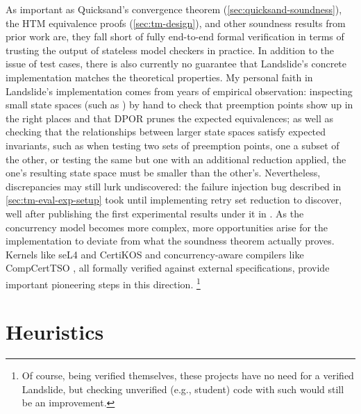 As important as Quicksand's convergence theorem (\cref{sec:quicksand-soundness}),
the HTM equivalence proofs (\cref{sec:tm-design}),
and other soundness results from prior work are,
they fall short of fully end-to-end formal verification
in terms of trusting the output of stateless model checkers in practice.
In addition to the issue of test cases,
there is also currently no guarantee that Landslide's concrete implementation
matches the theoretical properties.
My personal faith in Landslide's implementation comes from years of empirical observation:
inspecting small state spaces
(such as )
by hand
to check that preemption points show up in the right places
and that DPOR prunes the expected equivalences;
as well as checking that the relationships between larger state spaces satisfy expected invariants,
such as when testing two sets of preemption points, one a subset of the other,
or testing the same but one with an additional reduction applied,
the one's resulting state space must be smaller than the other's.
Nevertheless, discrepancies may still lurk undiscovered:
the failure injection bug described in \cref{sec:tm-eval-exp-setup}
took until implementing retry set reduction to discover,
well after publishing the first experimental results under it in \cite{sigbovik-htm}.
As the concurrency model becomes more complex,
more opportunities arise for the implementation to deviate from what the soundness theorem actually proves.
Kernels like seL4 \cite{sel4} and CertiKOS \cite{certikos}
and concurrency-aware compilers like CompCertTSO \cite{compcerttso},
all formally verified against external specifications,
provide important pioneering steps in this direction.%
\footnote{Of course, being verified themselves, these projects have no need for a verified Landslide,
but checking unverified (e.g., student) code with such would still be an improvement.}

\section{Heuristics}
\label{sec:warpzone-heuristics}

